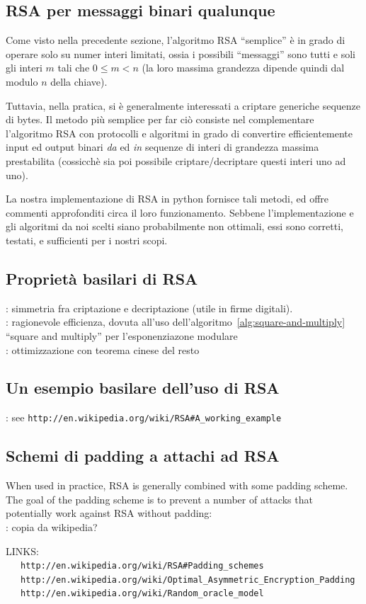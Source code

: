 \documentclass[pdflatex,11pt,a4paper,oneside]{article}
\newcommand{\XXX}[1][XXX]{\text{\bfseries{\color{red}{\emph{#1}}}}}
\newcommand{\TODO}[0]{\XXX[TODO]}
\begin{document}
\subsection{RSA per messaggi binari qualunque}

Come visto nella precedente sezione, l'algoritmo RSA ``semplice'' \`e
in grado di operare solo su numer interi limitati, ossia i possibili
``messaggi'' sono tutti e soli gli interi $m$ tali che $0 \leq m < n$
(la loro massima grandezza dipende quindi dal modulo $n$ della chiave).

Tuttavia, nella pratica, si \`e generalmente interessati a criptare
generiche sequenze di bytes.  Il metodo pi\`u semplice per far ci\`o
consiste nel complementare l'algoritmo RSA con protocolli e algoritmi
in grado di convertire efficientemente input ed output binari \emph{da}
ed \emph{in} sequenze di interi di grandezza massima prestabilita
(cossicch\`e sia poi possibile criptare/decriptare questi interi uno
ad uno).

La nostra implementazione di RSA in python fornisce tali metodi, ed
offre commenti approfonditi circa il loro funzionamento. Sebbene
l'implementazione e gli algoritmi da noi scelti siano probabilmente
non ottimali, essi sono corretti, testati, e sufficienti per i nostri
scopi.

\subsection{Propriet\`a basilari di RSA}\label{subset:rsa-properties}

\TODO: simmetria fra criptazione e decriptazione (utile in firme digitali).
\\
\TODO: ragionevole efficienza, dovuta all'uso
       dell'algoritmo~\eqref{alg:square-and-multiply}
       ``square and multiply'' per l'esponenziazone modulare
\\
\TODO: ottimizzazione con teorema cinese del resto

\subsection{Un esempio basilare dell'uso di RSA}

\TODO: see \verb+http://en.wikipedia.org/wiki/RSA#A_working_example+

\subsection{Schemi di padding a attachi ad RSA}

When used in practice, RSA is generally combined with some padding scheme.
The goal of the padding scheme is to prevent a number of attacks that
potentially work against RSA without padding:\\
\TODO: copia da wikipedia?

LINKS:\\
~~~\verb+http://en.wikipedia.org/wiki/RSA#Padding_schemes+\\
~~~\verb+http://en.wikipedia.org/wiki/Optimal_Asymmetric_Encryption_Padding+
~~~\verb+http://en.wikipedia.org/wiki/Random_oracle_model+

\end{document}
